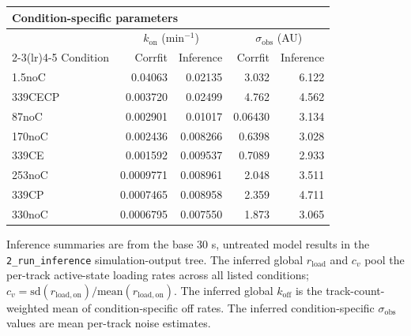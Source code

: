 \begin{table}[tbp]
\begin{tabular}{lrrrr}
\toprule
\multicolumn{5}{l}{\textbf{Condition-specific parameters}} \\
\midrule
& \multicolumn{2}{c}{$k_{\mathrm{on}}$ (min$^{-1}$)} & \multicolumn{2}{c}{$\sigma_{\mathrm{obs}}$ (AU)} \\
\cmidrule(lr){2-3}\cmidrule(lr){4-5}
Condition & Corrfit & Inference & Corrfit & Inference \\
\midrule
1.5noC & 0.04063 & 0.02135 & 3.032 & 6.122 \\
339CECP & 0.003720 & 0.02499 & 4.762 & 4.562 \\
87noC & 0.002901 & 0.01017 & 0.06430 & 3.134 \\
170noC & 0.002436 & 0.008266 & 0.6398 & 3.028 \\
339CE & 0.001592 & 0.009537 & 0.7089 & 2.933 \\
253noC & 0.0009771 & 0.008961 & 2.048 & 3.511 \\
339CP & 0.0007465 & 0.008958 & 2.359 & 4.711 \\
330noC & 0.0006795 & 0.007550 & 1.873 & 3.065 \\
\bottomrule
\end{tabular}

\smallskip
\begin{minipage}{0.97\linewidth}
\footnotesize Inference summaries are from the base 30 s, untreated model results in
the \texttt{2\_run\_inference} simulation-output tree. The inferred global
$r_{\mathrm{load}}$ and
$c_v$ pool the per-track active-state loading rates across all listed
conditions; $c_v=\mathrm{sd}(r_{\mathrm{load,on}})/
\mathrm{mean}(r_{\mathrm{load,on}})$. The inferred global $k_{\mathrm{off}}$
is the track-count-weighted mean of condition-specific off rates. The inferred
condition-specific $\sigma_{\mathrm{obs}}$ values are mean per-track noise
estimates.
\end{minipage}
\end{table}
